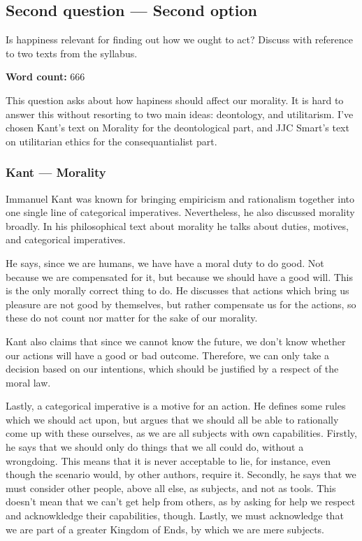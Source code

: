 \documentclass{article}
\begin{document}
\subsection*{Second question --- Second option}
	Is happiness relevant for finding out how we ought to act? Discuss with reference to two texts from the syllabus.
	\begin{flushright}
		\textbf{Word count:} 666
	\end{flushright}
	
	This question asks about how hapiness should affect our morality. It is hard to answer this without resorting to two main ideas: deontology, and utilitarism. I've chosen Kant's text on Morality for the deontological part, and JJC Smart's text on utilitarian ethics for the consequantialist part.
	
	\subsubsection*{Kant --- Morality}
		Immanuel Kant was known for bringing empiricism and rationalism together into one single line of categorical imperatives. Nevertheless, he also discussed morality broadly. In his philosophical text about morality he talks about duties, motives, and categorical imperatives. 

		He says, since we are humans, we have have a moral duty to do good. Not because we are compensated for it, but because we should have a good will. This is the only morally correct thing to do. He discusses that actions which bring us pleasure are not good by themselves, but rather compensate us for the actions, so these do not count nor matter for the sake of our morality. 

		Kant also claims that since we cannot know the future, we don't know whether our actions will have a good or bad outcome. Therefore, we can only take a decision based on our intentions, which should be justified by a respect of the moral law. 

		Lastly, a categorical imperative is a motive for an action. He defines some rules which we should act upon, but argues that we should all be able to rationally come up with these ourselves, as we are all subjects with own capabilities. Firstly, he says that we should only do things that we all could do, without a wrongdoing. This means that it is never acceptable to lie, for instance, even though the scenario would, by other authors, require it. Secondly, he says that we must consider other people, above all else, as subjects, and not as tools. This doesn't mean that we can't get help from others, as by asking for help we respect and acknowkledge their capabilities, though. Lastly, we must acknowledge that we are part of a greater Kingdom of Ends, by which we are mere subjects.
		
\end{document}
